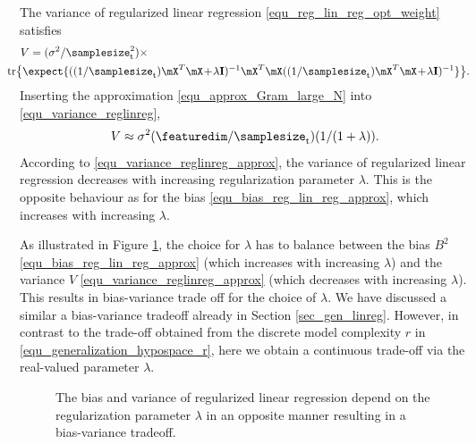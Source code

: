 \documentclass[12pt]{report}
\begin{document}
The variance of regularized linear regression \eqref{equ_reg_lin_reg_opt_weight} satisfies 
\begin{align}
\label{equ_variance_reglinreg}
V & =( \sigma^{2}/\samplesize^{2}_{\rm t}) \times \nonumber \\ 
& \hspace*{-7mm} {\rm tr} \big\{  \expect \{  ( (1/\samplesize_{\rm t}) \mX^{T} \mX\!+\!\lambda \mathbf{I} )^{-1} \mX^{T} \mX ( (1/\samplesize_{\rm t}) \mX^{T} \mX\!+\!\lambda \mathbf{I} )^{-1}   \} \big\}.
\end{align}
Inserting the approximation \eqref{equ_approx_Gram_large_N} into \eqref{equ_variance_reglinreg},  
\begin{equation}
\label{equ_variance_reglinreg_approx}
V \approx \sigma^{2} (\featuredim/\samplesize_{\rm t}) (1/(1+ \lambda)).
\end{equation} 
According to \eqref{equ_variance_reglinreg_approx}, the variance of regularized linear 
regression decreases with increasing regularization parameter $\lambda$. This is the 
opposite behaviour as for the bias \eqref{equ_bias_reg_lin_reg_approx}, which increases 
with increasing $\lambda$. 

As illustrated in Figure \ref{fig_bias_variance_lambda}, the choice for $\lambda$ has 
to balance between the bias $B^{2}$ \eqref{equ_bias_reg_lin_reg_approx} 
(which increases with increasing $\lambda$) and the variance $V$ \eqref{equ_variance_reglinreg_approx} 
(which decreases with increasing $\lambda$). This results in bias-variance trade 
off for the choice of $\lambda$. We have discussed a similar a bias-variance tradeoff 
already in Section \ref{sec_gen_linreg}. However, in contrast to the trade-off 
obtained from the discrete model complexity $r$ in \eqref{equ_generalization_hypospace_r}, 
here we obtain a continuous trade-off via the real-valued parameter $\lambda$. 


\begin{figure}
\begin{center}
\end{center}
\caption{The bias and variance of regularized linear regression depend on the regularization parameter 
$\lambda$ in an opposite manner resulting in a bias-variance tradeoff.}
\label{fig_bias_variance_lambda}
\end{figure}
\end{document}
